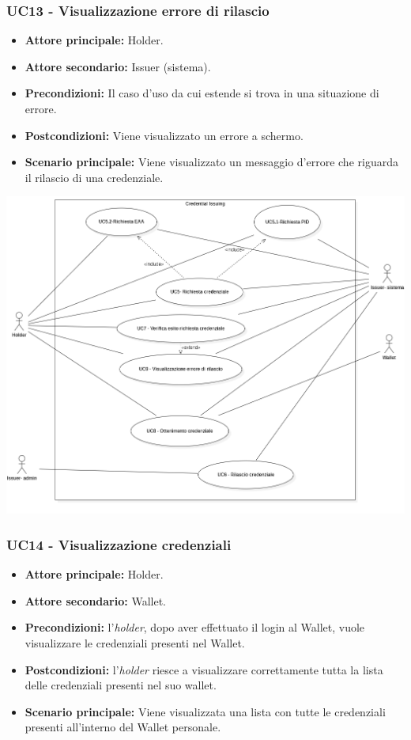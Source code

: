 \subsubsection{UC13 - Visualizzazione errore di rilascio}
\begin{itemize}
    \item \textbf{Attore principale:} Holder.
    \item  \textbf{Attore secondario:} Issuer (sistema).
    \item \textbf{Precondizioni:} Il caso d'uso da cui estende si trova in una situazione di errore.
    \item \textbf{Postcondizioni:} Viene visualizzato un errore a schermo. 
    \item \textbf{Scenario principale:} Viene visualizzato un messaggio d’errore che riguarda il rilascio di una credenziale.
\end{itemize}

\begin{center}
    \includegraphics[scale = 0.65]{./res/img/UC2.PNG}
\end{center}

\subsubsection{UC14 - Visualizzazione credenziali}
\begin{itemize}
    \item \textbf{Attore principale:} Holder.
    \item \textbf{Attore secondario:} Wallet.
    \item \textbf{Precondizioni:} l'\textit{holder}, dopo aver effettuato il login al Wallet, vuole visualizzare le credenziali presenti nel Wallet. 
    \item \textbf{Postcondizioni:} l'\textit{holder} riesce a visualizzare correttamente tutta la lista delle credenziali presenti nel suo wallet. 
    \item \textbf{Scenario principale:} Viene visualizzata una lista con tutte le credenziali presenti all'interno del Wallet personale. 
\end{itemize}


